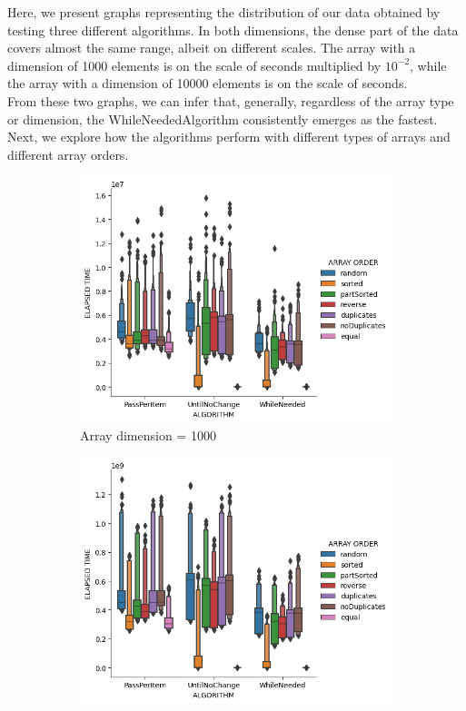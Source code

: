 \documentclass{article}
\begin{document}
Here, we present graphs representing the distribution of our data obtained by testing three different algorithms. In both dimensions, the dense part of the data covers almost the same range, albeit on different scales. The array with a dimension of 1000 elements is on the scale of seconds multiplied by $10^{-2}$, while the array with a dimension of 10000 elements is on the scale of seconds.\\

From these two graphs, we can infer that, generally, regardless of the array type or dimension, the WhileNeededAlgorithm consistently emerges as the fastest.\\

Next, we explore how the algorithms perform with different types of arrays and different array orders.\\
\begin{figure}[H]
    \centering
    \begin{subfigure}[b]{0.48\textwidth}
        \centering
        \includegraphics[width=\textwidth]{./data/array_order_1000.png}
        \caption{Array dimension = 1000}
    \end{subfigure}
    \hfill
    \begin{subfigure}[b]{0.48\textwidth}
        \centering
        \includegraphics[width=\textwidth]{./data/array_order_10000.png}

\end{subfigure}
\end{figure}
\end{document}
